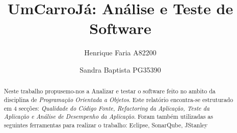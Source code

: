 

\title{UmCarroJá: Análise e Teste de Software}

\author{Henrique Faria A82200 \and Sandra Baptista PG35390}




\maketitle

\begin{abstract}
Neste trabalho propusemo-nos a Analizar e testar o software feito no ambito da disciplina de \textit{Programação Orientada a Objetos}.\newline
Este relatório encontra-se estruturado em 4 secções: \textit{Qualidade do Código Fonte, Refactoring da Aplicação, Teste da Aplicação e Análise de Desempenho da Aplicação}.\newline
Foram também utilizadas as seguintes ferramentas para realizar o trabalho:\newline
Eclipse, SonarQube, JStanley
\end{abstract}




